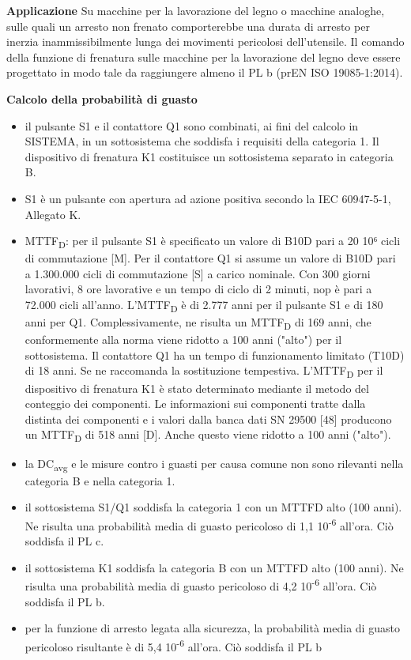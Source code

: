 \textbf{Applicazione}
Su macchine per la lavorazione del legno o macchine analoghe, sulle quali un arresto non frenato comporterebbe una durata di arresto per inerzia inammissibilmente lunga dei movimenti pericolosi dell'utensile. Il comando della funzione di frenatura sulle macchine per la lavorazione del legno deve essere progettato in modo tale da raggiungere almeno il PL b (prEN ISO 19085-1:2014).

\textbf{Calcolo della probabilità di guasto}
\begin{itemize}
    \item il pulsante S1 e il contattore Q1 sono combinati, ai fini del calcolo in SISTEMA, in un sottosistema che soddisfa i requisiti della categoria 1. Il dispositivo di frenatura K1 costituisce un sottosistema separato in categoria B.
    \item S1 è un pulsante con apertura ad azione positiva secondo la IEC 60947-5-1, Allegato K.
    \item MTTF\textsubscript{D}: per il pulsante S1 è specificato un valore di B10D pari a 20 10⁶ cicli di commutazione [M]. Per il contattore Q1 si assume un valore di B10D pari a 1.300.000 cicli di commutazione [S] a carico nominale. Con 300 giorni lavorativi, 8 ore lavorative e un tempo di ciclo di 2 minuti, nop è pari a 72.000 cicli all'anno. L'MTTF\textsubscript{D} è di 2.777 anni per il pulsante S1 e di 180 anni per Q1. Complessivamente, ne risulta un MTTF\textsubscript{D} di 169 anni, che conformemente alla norma viene ridotto a 100 anni ("alto") per il sottosistema. Il contattore Q1 ha un tempo di funzionamento limitato (T10D) di 18 anni. Se ne raccomanda la sostituzione tempestiva. L'MTTF\textsubscript{D} per il dispositivo di frenatura K1 è stato determinato mediante il metodo del conteggio dei componenti. Le informazioni sui componenti tratte dalla distinta dei componenti e i valori dalla banca dati SN 29500 [48] producono un MTTF\textsubscript{D} di 518 anni [D]. Anche questo viene ridotto a 100 anni ("alto").
    \item la DC\textsubscript{avg} e le misure contro i guasti per causa comune non sono rilevanti nella categoria B e nella categoria 1.
    \item il sottosistema S1/Q1 soddisfa la categoria 1 con un MTTFD alto (100 anni). Ne risulta una probabilità media di guasto pericoloso di 1,1 10\textsuperscript{-6} all'ora. Ciò soddisfa il PL c.
    \item il sottosistema K1 soddisfa la categoria B con un MTTFD alto (100 anni). Ne risulta una probabilità media di guasto pericoloso di 4,2 10\textsuperscript{-6} all'ora. Ciò soddisfa il PL b.
    \item per la funzione di arresto legata alla sicurezza, la probabilità media di guasto pericoloso risultante è di 5,4 10\textsuperscript{-6} all'ora. Ciò soddisfa il PL b
\end{itemize}
\clearpage

